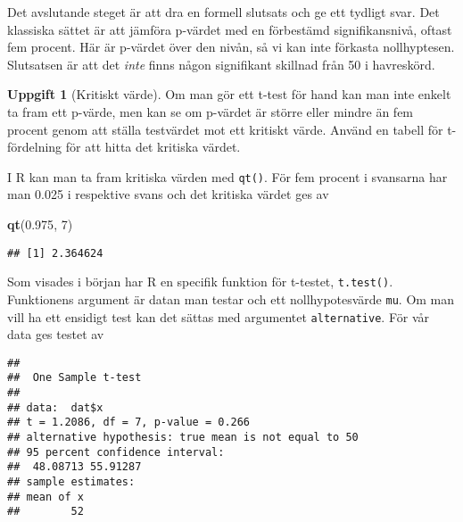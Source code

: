 \documentclass[
]{book}
\newenvironment{Shaded}{\begin{snugshade}}{\end{snugshade}}
\newcommand{\AttributeTok}[1]{\textcolor[rgb]{0.13,0.29,0.53}{#1}}
\newcommand{\CommentTok}[1]{\textcolor[rgb]{0.56,0.35,0.01}{\textit{#1}}}
\newcommand{\DecValTok}[1]{\textcolor[rgb]{0.00,0.00,0.81}{#1}}
\newcommand{\FloatTok}[1]{\textcolor[rgb]{0.00,0.00,0.81}{#1}}
\newcommand{\FunctionTok}[1]{\textcolor[rgb]{0.13,0.29,0.53}{\textbf{#1}}}
\newcommand{\NormalTok}[1]{#1}
\newcommand{\SpecialCharTok}[1]{\textcolor[rgb]{0.81,0.36,0.00}{\textbf{#1}}}
\theoremstyle{definition}
\theoremstyle{definition}
\theoremstyle{definition}
\newtheorem{exercise}{Uppgift}[chapter]
\theoremstyle{definition}
\theoremstyle{remark}
\begin{document}
Det avslutande steget är att dra en formell slutsats och ge ett tydligt svar. Det klassiska sättet är att jämföra p-värdet med en förbestämd signifikansnivå, oftast fem procent. Här är p-värdet över den nivån, så vi kan inte förkasta nollhyptesen. Slutsatsen är att det \emph{inte} finns någon signifikant skillnad från 50 i havreskörd.

\begin{exercise}[Kritiskt värde]

Om man gör ett t-test för hand kan man inte enkelt ta fram ett p-värde, men kan se om p-värdet är större eller mindre än fem procent genom att ställa testvärdet mot ett kritiskt värde. Använd en tabell för t-fördelning för att hitta det kritiska värdet.

I R kan man ta fram kritiska värden med \texttt{qt()}. För fem procent i svansarna har man 0.025 i respektive svans och det kritiska värdet ges av

\begin{Shaded}
\begin{Highlighting}[]
\FunctionTok{qt}\NormalTok{(}\FloatTok{0.975}\NormalTok{, }\DecValTok{7}\NormalTok{)}
\end{Highlighting}
\end{Shaded}

\begin{verbatim}
## [1] 2.364624
\end{verbatim}

\end{exercise}

Som visades i början har R en specifik funktion för t-testet, \texttt{t.test()}. Funktionens argument är datan man testar och ett nollhypotesvärde \texttt{mu}. Om man vill ha ett ensidigt test kan det sättas med argumentet \texttt{alternative}. För vår data ges testet av

\begin{Shaded}
\end{Shaded}

\begin{verbatim}
## 
##  One Sample t-test
## 
## data:  dat$x
## t = 1.2086, df = 7, p-value = 0.266
## alternative hypothesis: true mean is not equal to 50
## 95 percent confidence interval:
##  48.08713 55.91287
## sample estimates:
## mean of x 
##        52
\end{verbatim}
\end{document}
